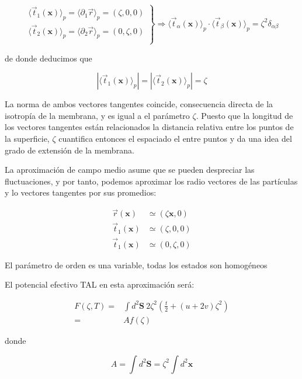 \begin{equation}
 \left.\begin{array}{c}
\langle\vec{t}_{1}(\mathbf{x})\rangle_{p}=\langle\partial_1\vec{r}\rangle_{p}=(\zeta ,0,0)\\
\langle\vec{t}_{2}(\mathbf{x})\rangle_{p}=\langle\partial_2\vec{r}\rangle_{p}=(0,\zeta ,0)\\
 \end{array}\right\}\Rightarrow
\langle\vec{t}_{\alpha}(\mathbf{x})\rangle_{p}\cdot\langle\vec{t}_{\beta}(\mathbf{x})\rangle_{p}=\zeta^2 \delta_{\alpha\beta}
\end{equation}

de donde deducimos que

\begin{equation}
|\langle\vec{t}_1(\mathbf{x})\rangle_{p}|=|\langle\vec{t}_2(\mathbf{x})\rangle_{p}|=\zeta
\end{equation}

La norma de ambos vectores tangentes coincide, consecuencia directa de la
isotropía de la membrana, y es igual a el parámetro $\zeta$. Puesto que la
longitud de los vectores tangentes están relacionados la distancia relativa
entre los puntos de la superficie, $\zeta$ cuantifica entonces el espaciado el
 entre puntos y da una idea del grado de extensión de la membrana.
 
La aproximación de campo medio asume que se pueden despreciar las
fluctuaciones, y por tanto, podemos aproximar los radio vectores de las
partículas y lo vectores tangentes por sus promedios:

\begin{align}
 \vec{r}(\mathbf{x})&\simeq(\zeta \mathbf{x},0)\\
 \vec{t}_{1}(\mathbf{x})&\simeq(\zeta ,0,0)\\
 \vec{t}_{1}(\mathbf{x})&\simeq(0,\zeta,0)
\end{align}

El parámetro de orden es una variable, todas los estados son homogéneos

El potencial efectivo TAL en esta aproximación será:

\begin{align}
  F(\zeta,T)=&\int\! d^2 \mathbf{S}\ 2\zeta^2\!\left( \frac{t}{2} + (u+2v)\zeta^2\right)\\
  =&Af(\zeta)
\end{align}

donde 

$$A=\int d^2 \mathbf{S}=\zeta^2\int d^2 \mathbf{x}$$

